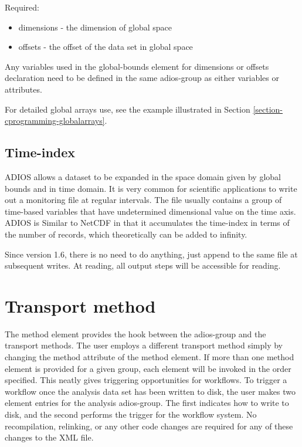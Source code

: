 Required:
\begin{itemize}
\item dimensions - the dimension of global space
\item offsets - the offset of the data set in global space
\end{itemize}

Any variables used in the global-bounds element for dimensions or offsets declaration 
need to be defined in the same adios-group as either variables or attributes. 

For detailed global arrays use, see the example illustrated in 
Section \ref{section-cprogramming-globalarrays}.


\subsection{Time-index}

ADIOS allows a dataset to be expanded in the space domain given by global bounds 
and in time domain. It is very common for scientific applications to write out 
a monitoring file at regular intervals. The file usually contains a group of time-based 
variables that have undetermined dimensional value on the time axis. ADIOS is Similar 
to NetCDF in that it accumulates the time-index in terms of the number of records, 
which theoretically can be added to infinity.

Since version 1.6, there is no need to do anything, just append to the same file at subsequent writes. At reading, all output steps will be accessible for reading.



\section{Transport method} 

The method element provides the 
hook between the adios-group and the transport methods. The user employs a different 
transport method simply by changing the method attribute of the method element. 
If more than one method element is provided for a given group, each element will 
be invoked in the order specified. This neatly gives triggering opportunities for 
workflows. To trigger a workflow once the analysis data set has been written to 
disk, the user makes two element entries for the analysis adios-group. The first 
indicates how to write to disk, and the second performs the trigger for the workflow 
system. No recompilation, relinking, or any other code changes are required for 
any of these changes to the XML file.

